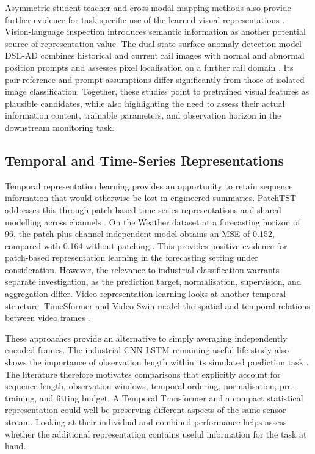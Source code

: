 Asymmetric student-teacher and cross-modal mapping methods also provide further evidence for
task-specific use of the learned visual representations
\parencite{Rudolph2023Asymmetric,Costanzino2024Multimodal}.
Vision-language inspection introduces semantic information as another potential source of
representation value. The dual-state surface anomaly detection model DSE-AD combines historical and current rail images with normal and abnormal
position prompts and assesses pixel localisation on a further rail domain \parencite{P031}.
Its pair-reference and prompt assumptions differ significantly from those of isolated image
classification.
Together, these studies point to pretrained visual features as plausible candidates, while also
highlighting the need to assess their actual information content, trainable parameters, and
observation horizon in the downstream monitoring task.

\subsection{Temporal and Time-Series Representations}

Temporal representation learning provides an opportunity to retain sequence information that would
otherwise be lost in engineered summaries.
PatchTST addresses this through patch-based time-series representations and shared modelling across
channels \parencite[Sections~3.1--3.2]{Nie2023PatchTST}.
On the Weather dataset at a forecasting horizon of 96, the patch-plus-channel independent model
obtains an MSE of 0.152, compared with 0.164 without patching \parencite[Table~7]{Nie2023PatchTST}.
This provides positive evidence for patch-based representation learning in the forecasting setting
under consideration. However, the relevance to industrial classification warrants separate
investigation, as the prediction target, normalisation, supervision, and aggregation differ.
Video representation learning looks at another temporal structure. TimeSformer and Video Swin model
the spatial and temporal relations between video frames \parencite{P034,P013}.

These approaches provide an alternative to simply averaging independently encoded frames. The
industrial CNN-LSTM remaining useful life study also shows the importance of observation length
within its simulated prediction task \parencite{AlDulaimi2019A}.
The literature therefore motivates comparisons that explicitly account for sequence length,
observation windows, temporal ordering, normalisation, pre-training, and fitting budget.
A Temporal Transformer and a compact statistical representation could well be preserving different
aspects of the same sensor stream. Looking at their individual and combined performance helps assess
whether the additional representation contains useful information for the task at hand.

